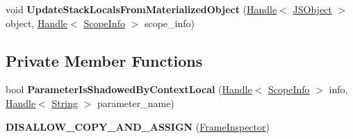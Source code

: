 \begin{DoxyCompactItemize}
\item 
void {\bfseries Update\+Stack\+Locals\+From\+Materialized\+Object} (\hyperlink{classv8_1_1internal_1_1_handle}{Handle}$<$ \hyperlink{classv8_1_1internal_1_1_j_s_object}{J\+S\+Object} $>$ object, \hyperlink{classv8_1_1internal_1_1_handle}{Handle}$<$ \hyperlink{classv8_1_1internal_1_1_scope_info}{Scope\+Info} $>$ scope\+\_\+info)\hypertarget{classv8_1_1internal_1_1_frame_inspector_a71fba9ad7004b31f21f6506f0365628a}{}\label{classv8_1_1internal_1_1_frame_inspector_a71fba9ad7004b31f21f6506f0365628a}

\end{DoxyCompactItemize}
\subsection*{Private Member Functions}
\begin{DoxyCompactItemize}
\item 
bool {\bfseries Parameter\+Is\+Shadowed\+By\+Context\+Local} (\hyperlink{classv8_1_1internal_1_1_handle}{Handle}$<$ \hyperlink{classv8_1_1internal_1_1_scope_info}{Scope\+Info} $>$ info, \hyperlink{classv8_1_1internal_1_1_handle}{Handle}$<$ \hyperlink{classv8_1_1internal_1_1_string}{String} $>$ parameter\+\_\+name)\hypertarget{classv8_1_1internal_1_1_frame_inspector_a9f49e55c47989988d95567e3da200578}{}\label{classv8_1_1internal_1_1_frame_inspector_a9f49e55c47989988d95567e3da200578}

\item 
{\bfseries D\+I\+S\+A\+L\+L\+O\+W\+\_\+\+C\+O\+P\+Y\+\_\+\+A\+N\+D\+\_\+\+A\+S\+S\+I\+GN} (\hyperlink{classv8_1_1internal_1_1_frame_inspector}{Frame\+Inspector})\hypertarget{classv8_1_1internal_1_1_frame_inspector_a904cad7de1d0e6ff91970d39c58e26e2}{}\label{classv8_1_1internal_1_1_frame_inspector_a904cad7de1d0e6ff91970d39c58e26e2}

\end{DoxyCompactItemize}
